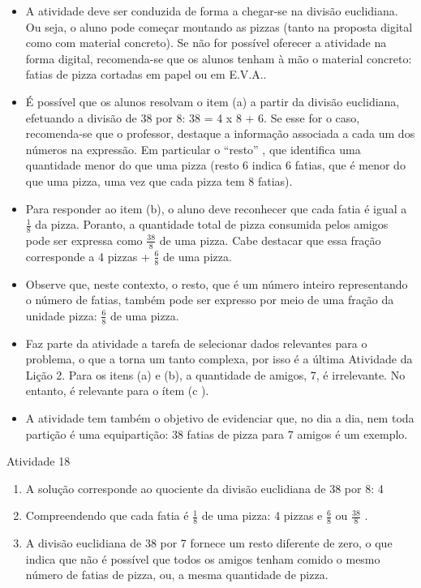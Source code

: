 \documentclass[oneside]{book}
\begin{document}
\begin{multicols}{2}
\begin{itemize} %
    \item       A atividade deve ser conduzida de forma a chegar-se na divisão euclidiana. Ou seja, o aluno pode começar montando as pizzas (tanto na proposta digital como com material concreto). Se não for possível oferecer a atividade na forma digital, recomenda-se que os alunos tenham à mão o material concreto: fatias de pizza cortadas em papel ou em E.V.A..
    \item       É possível que os alunos resolvam o item (a) a partir da divisão euclidiana, efetuando a divisão de 38 por 8: 38 = 4 x 8 + 6. Se esse for o caso, recomenda-se que o professor, destaque a informação associada a cada um dos números na expressão. Em particular o       ``resto''      , que identifica uma quantidade menor do que uma pizza (resto 6 indica 6 fatias, que é menor do que uma pizza, uma vez que cada pizza tem 8 fatias).
    \item       Para responder ao item (b), o aluno deve reconhecer que cada fatia é igual a       $\frac{1}{8}$       da pizza. Poranto, a quantidade total de pizza consumida pelos amigos pode ser expressa como       $\frac{38}{8}$       de uma pizza. Cabe destacar que essa fração corresponde a 4 pizzas +       $\frac{6}{8}$       de uma pizza.
    \item        Observe que, neste contexto, o resto, que é um número inteiro representando o número de fatias, também pode ser expresso por meio de uma fração da unidade pizza:       $\frac{6}{8}$       de uma pizza.
    \item       Faz parte da atividade a tarefa de selecionar dados relevantes para o problema, o que a torna um tanto complexa, por isso é a última Atividade da Lição 2. Para os itens (a) e (b), a quantidade de amigos, 7, é irrelevante. No entanto, é relevante para o ítem (c ).
    \item       A atividade tem também o objetivo de evidenciar que, no dia a dia, nem toda partição é uma equipartição: 38 fatias de pizza para 7 amigos é um exemplo.
\end{itemize} %



\begin{resposta*}{Atividade 18}

\begin{enumerate} [\quad a)] %
    \item       A solução corresponde ao quociente da divisão euclidiana de 38 por 8: 4
    \item       Compreendendo que cada fatia é       $\frac{1}{8}$        de uma pizza: 4 pizzas e       $\frac{6}{8}$       ou       $\frac{38}{8}$      .
    \item       A divisão euclidiana de 38 por 7 fornece um resto diferente de zero, o que indica que não é possível que todos os amigos tenham comido o mesmo número de fatias de pizza, ou, a mesma quantidade de pizza.
\end{enumerate} %


\end{resposta*}


\end{multicols}
\end{document}
